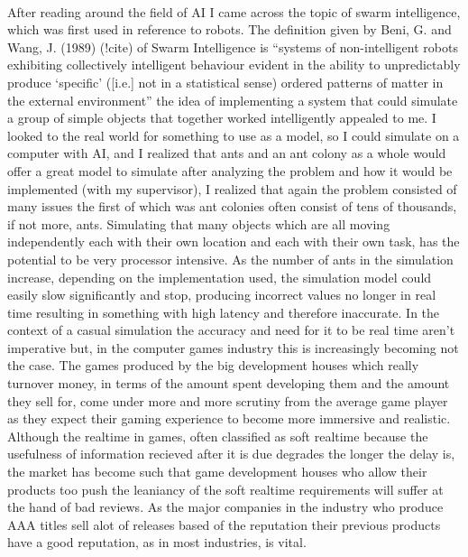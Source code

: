 \documentclass{report}
\begin{document}
\paragraph{}After reading around the field of AI I came across the topic of swarm intelligence, which was first used in reference to robots. The definition given by Beni, G. and Wang, J. (1989) (!cite) of Swarm Intelligence is ``systems of non-intelligent robots exhibiting collectively intelligent behaviour evident in the ability to unpredictably produce `specific' ([i.e.] not in a statistical sense) ordered patterns of matter in the external environment'' the idea of implementing a system that could simulate a group of simple objects that together worked intelligently appealed to me. I looked to the real world for something to use as a model, so I could simulate on a computer with AI, and I realized that ants and an ant colony as a whole would offer a great model to simulate after analyzing the problem and how it would be implemented (with my supervisor), I realized that again the problem consisted of many issues the first of which was ant colonies often consist of tens of thousands, if not more, ants. Simulating that many objects which are all moving independently each with their own location and each with their own task, has the potential to be very processor intensive. As the number of ants in the simulation increase, depending on the implementation used, the simulation model could easily slow significantly and stop, producing incorrect values no longer in real time resulting in something with high latency and therefore inaccurate. In the context of a casual simulation the accuracy and need for it to be real time aren't imperative but, in the computer games industry this is increasingly becoming not the case. The games produced by the big development houses which really turnover money, in terms of the amount spent developing them and the amount they sell for, come under more and more scrutiny from the average game player as they expect their gaming experience to become more immersive and realistic. Although the realtime in games, often classified as soft realtime because the usefulness of information recieved after it is due degrades the longer the delay is, the market has become such that game development houses who allow their products too push the leaniancy of the soft realtime requirements will suffer at the hand of bad reviews. As the major companies in the industry who produce AAA titles sell alot of releases based of the reputation their previous products have a good reputation, as in most industries, is vital.
\end{document}
